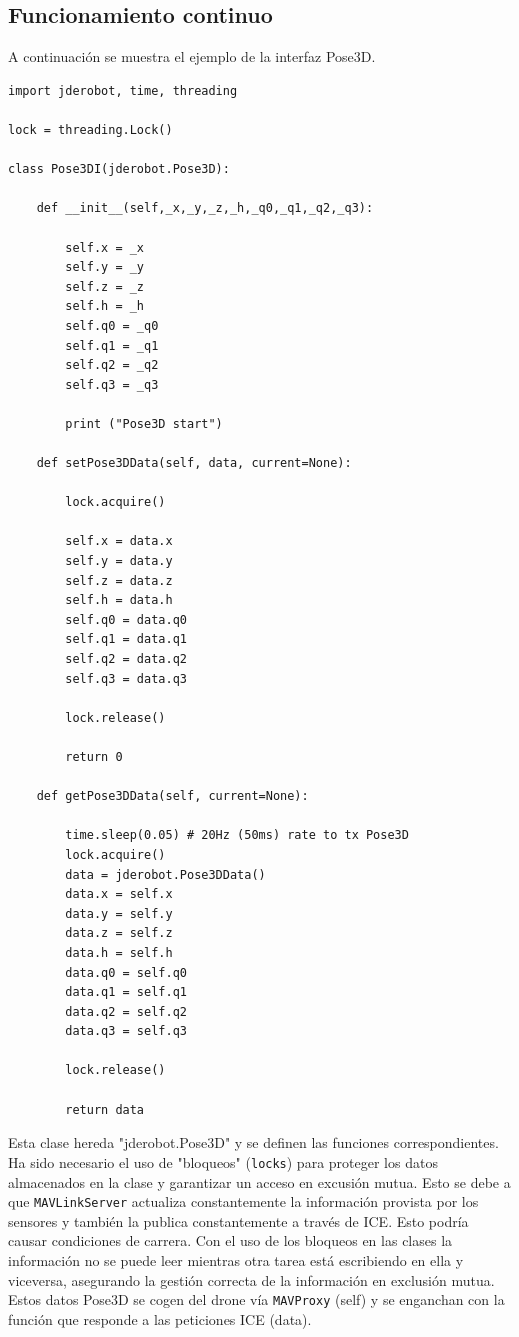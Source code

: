 \subsection{Funcionamiento continuo}

A continuación se muestra el ejemplo de la interfaz Pose3D.

\bigskip
\bigskip

\begin{lstlisting}[frame=single]
import jderobot, time, threading

lock = threading.Lock()

class Pose3DI(jderobot.Pose3D):

    def __init__(self,_x,_y,_z,_h,_q0,_q1,_q2,_q3):

        self.x = _x
        self.y = _y
        self.z = _z
        self.h = _h
        self.q0 = _q0
        self.q1 = _q1
        self.q2 = _q2
        self.q3 = _q3

        print ("Pose3D start")

    def setPose3DData(self, data, current=None):

        lock.acquire()

        self.x = data.x
        self.y = data.y
        self.z = data.z
        self.h = data.h
        self.q0 = data.q0
        self.q1 = data.q1
        self.q2 = data.q2
        self.q3 = data.q3

        lock.release()

        return 0

    def getPose3DData(self, current=None):

        time.sleep(0.05) # 20Hz (50ms) rate to tx Pose3D
        lock.acquire()
        data = jderobot.Pose3DData()
        data.x = self.x
        data.y = self.y
        data.z = self.z
        data.h = self.h
        data.q0 = self.q0
        data.q1 = self.q1
        data.q2 = self.q2
        data.q3 = self.q3

        lock.release()

        return data
\end{lstlisting}  

Esta clase hereda "jderobot.Pose3D" y se definen las funciones correspondientes. Ha sido necesario el uso de "bloqueos" (\texttt{locks}) para proteger los datos almacenados en la clase y garantizar un acceso en excusión mutua. Esto se debe a que \texttt{MAVLinkServer} actualiza constantemente la información provista por los sensores y también la publica constantemente a través de ICE. Esto podría causar condiciones de carrera. Con el uso de los bloqueos en las clases la información no se puede leer mientras otra tarea está escribiendo en ella y viceversa, asegurando la gestión correcta de la información en exclusión mutua. Estos datos Pose3D se cogen del drone vía \texttt{MAVProxy} (self) y se enganchan con la función que responde a las peticiones ICE (data).


